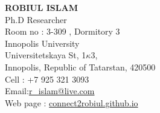 \documentclass[letterpaper,10pt]{article}
\begin{document}
\textbf{ROBIUL ISLAM }  \\ 
Ph.D Researcher \\ 
Room no : 3-309 , Dormitory 3 \\ 
Innopolis University \\ 
Universitetskaya St, 1$\kappa$3, \\
Innopolis, Republic of Tatarstan, 420500 \\
Cell : +7 925 321 3093 \\
Email:\href{mailto:r\_islam@live.com}{r\_islam@live.com} \\
Web page : \url{connect2robiul.github.io}


\end{document}
